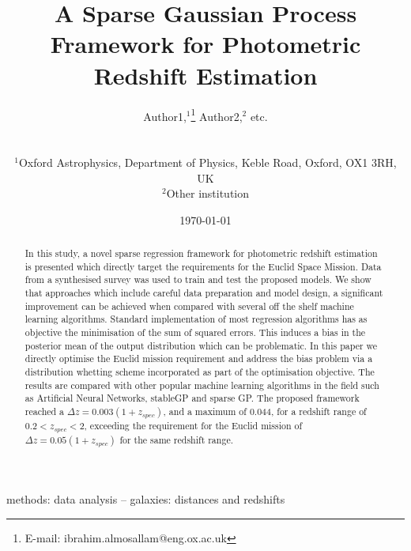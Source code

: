 \documentclass[useAMS,usenatbib,fleqn]{mn2e}
\title[A Sparse Gaussian Process Framework for Photometric Redshift Estimation]{A Sparse Gaussian Process Framework for Photometric Redshift Estimation}
\author[Almosallam et al.]
{\parbox{\textwidth}{Author1,$^1$\thanks{E-mail: ibrahim.almosallam@eng.ox.ac.uk} 
Author2,$^{2}$ etc.
} 
\vspace{0.4cm}\\ 
\parbox{\textwidth}{
$^1$Oxford Astrophysics, Department of Physics, Keble Road, Oxford, OX1 3RH, UK\\
$^2$Other institution \\
}}
\begin{document}
\date{\today}

\pagerange{\pageref{firstpage}--\pageref{lastpage}} 

\maketitle

\label{first page}

\begin{abstract}
In this study, a novel sparse regression framework for photometric redshift estimation is presented which directly target the requirements for the Euclid Space Mission. Data from a synthesised survey was used to train and test the proposed models. We show that approaches which include careful data preparation and model design, a significant improvement can be achieved when compared with several off the shelf machine learning algorithms. Standard implementation of most regression algorithms has as objective the minimisation of the sum of squared errors. This induces a bias in the posterior mean of the output distribution which can be problematic. In this paper we directly optimise the Euclid mission requirement and address the bias problem via a distribution whetting scheme incorporated as part of the optimisation objective. The results are compared with other popular machine learning algorithms in the field such as Artificial Neural Networks, stableGP and sparse GP. The proposed framework reached a $\Delta z = 0.003(1+z_{spec})$, and a maximum of 0.044, for a redshift range of $0.2 < z_{spec} < 2$, exceeding the requirement for the Euclid mission of $\Delta z = 0.05(1+z_{spec})$ for the same redshift range.

\end{abstract}

\begin{keywords}
methods: data analysis -- galaxies: distances and redshifts
\end{keywords}
\end{document}
